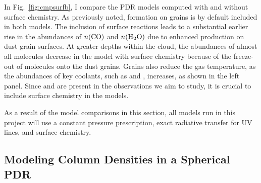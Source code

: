 \documentclass[12pt,a4paper]{article}
\newcommand{\mdpdr}{\texttt{MeudonPDR} code}
\begin{document}
In Fig.~\ref{fig:cmpsurfb}, I compare the PDR models computed with and without surface chemistry. As previously noted,  formation on grains is by default included in both models. The inclusion of surface reactions leads to a substantial earlier rise in the abundances of $n(\ce{CO})$ and $n(\ce{H2O})$ due to enhanced production on dust grain surfaces. At greater depths within the cloud, the abundances of almost all molecules decrease in the model with surface chemistry because of the freeze-out of molecules onto the dust grains. Grains also reduce the gas temperature, as the abundances of key coolants, such as  and , increases, as shown in the left panel. Since  and  are present in the observations we aim to study, it is crucial to include surface chemistry in the models.


As a result of the model comparisons in this section, all models run in this project will use a constant pressure prescription, exact radiative transfer for  UV lines, and surface chemistry.

\subsection{Modeling Column Densities in a Spherical PDR} \label{sec:sphere}

\end{document}
